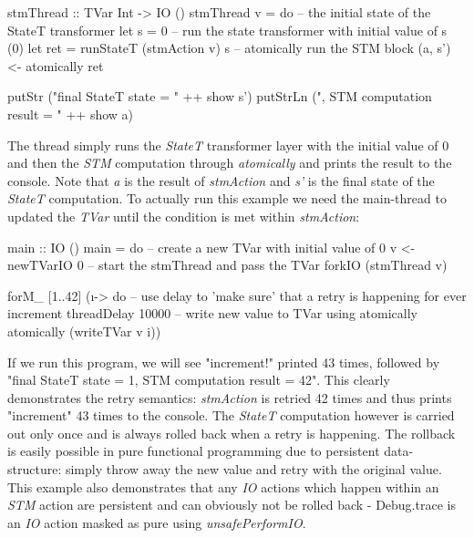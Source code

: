 \begin{HaskellCode}
stmThread :: TVar Int -> IO ()
stmThread v = do
  -- the initial state of the StateT transformer
  let s = 0
  -- run the state transformer with initial value of s (0)
  let ret = runStateT (stmAction v) s
  -- atomically run the STM block
  (a, s') <- atomically ret
  
  putStr ("final StateT state     = " ++ show s')
  putStrLn (", STM computation result = " ++ show a)
\end{HaskellCode}

The thread simply runs the \textit{StateT} transformer layer with the initial value of 0 and then the \textit{STM} computation through \textit{atomically} and prints the result to the console. Note that \textit{a} is the result of \textit{stmAction} and \textit{s'} is the final state of the \textit{StateT} computation. To actually run this example we need the main-thread to updated the \textit{TVar} until the condition is met within \textit{stmAction}:

\begin{HaskellCode}
main :: IO ()
main = do
  -- create a new TVar with initial value of 0
  v <- newTVarIO 0 
  -- start the stmThread and pass the TVar
  forkIO (stmThread v)

  forM_ [1..42] (\i -> do
    -- use delay to 'make sure' that a retry is happening for ever increment
    threadDelay 10000
    -- write new value to TVar using atomically
    atomically (writeTVar v i))
\end{HaskellCode}

If we run this program, we will see "increment!" printed 43 times, followed by "final StateT state = 1, STM computation result = 42". This clearly demonstrates the retry semantics: \textit{stmAction} is retried 42 times and thus prints "increment" 43 times to the console. The \textit{StateT} computation however is carried out only once and is always rolled back when a retry is happening. The rollback is easily possible in pure functional programming due to persistent data-structure: simply throw away the new value and retry with the original value. This example also demonstrates that any \textit{IO} actions which happen within an \textit{STM} action are persistent and can obviously not be rolled back - Debug.trace is an \textit{IO} action masked as pure using \textit{unsafePerformIO}.
